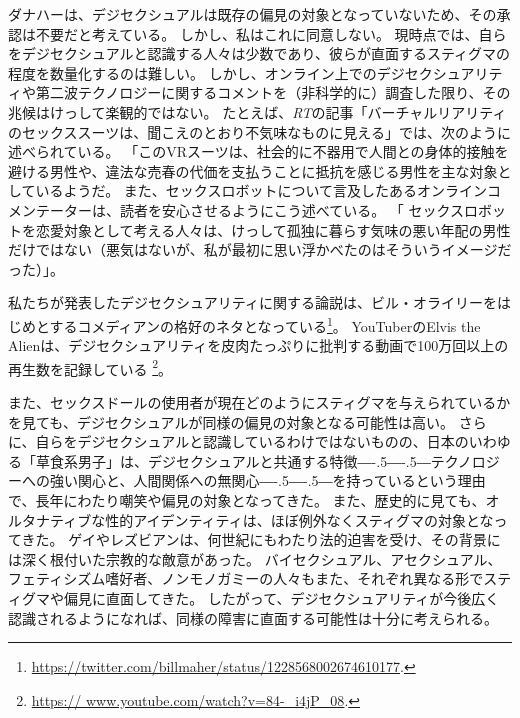 \documentclass[paper=a4,book,openany]{jlreq}
\def\DDASH{―\kern-.5\zw―\kern-.5\zw―} %
\begin{document}
ダナハーは、デジセクシュアルは既存の偏見の対象となっていないため、その承認は不要だと考えている。
しかし、私はこれに同意しない。
現時点では、自らをデジセクシュアルと認識する人々は少数であり、彼らが直面するスティグマの程度を数量化するのは難しい。
しかし、オンライン上でのデジセクシュアリティや第二波テクノロジーに関するコメントを（非科学的に）調査した限り、その兆候はけっして楽観的ではない。
たとえば、\emph{RT}の記事「バーチャルリアリティのセックススーツは、聞こえのとおり不気味なものに見える」では、次のように述べられている。
「このVRスーツは、社会的に不器用で人間との身体的接触を避ける男性や、違法な売春の代価を支払うことに抵抗を感じる男性を主な対象としているようだ\citep{rt16:_virtual_realit_sex_suit_looks}。
また、セックスロボットについて言及したあるオンラインコメンテーターは、読者を安心させるようにこう述べている。
「 セックスロボットを恋愛対象として考える人々は、けっして孤独に暮らす気味の悪い年配の男性だけではない（悪気はないが、私が最初に思い浮かべたのはそういうイメージだった）」\citep{richmond18:_rise_sex_robot}。

私たちが発表したデジセクシュアリティに関する論説は、ビル・オライリーをはじめとするコメディアンの格好のネタとなっている\footnote{\url{https://twitter.com/billmaher/status/1228568002674610177}.}。
YouTuberのElvis the Alienは、デジセクシュアリティを皮肉たっぷりに批判する動画で100万回以上の再生数を記録している
\footnote{\url{https:// www.youtube.com/watch?v=84-_i4jP_08}.}。

また、セックスドールの使用者が現在どのようにスティグマを与えられているかを見ても、デジセクシュアルが同様の偏見の対象となる可能性は高い\citep{knox17:_sex_dolls}。
さらに、自らをデジセクシュアルと認識しているわけではないものの、日本のいわゆる「草食系男子」は、デジセクシュアルと共通する特徴{\DDASH}テクノロジーへの強い関心と、人間関係への無関心{\DDASH}を持っているという理由で、長年にわたり嘲笑や偏見の対象となってきた\citep{harney09:_herbiv_dilem}。
また、歴史的に見ても、オルタナティブな性的アイデンティティは、ほぼ例外なくスティグマの対象となってきた。
ゲイやレズビアンは、何世紀にもわたり法的迫害を受け、その背景には深く根付いた宗教的な敵意があった。
バイセクシュアル、アセクシュアル、フェティシズム嗜好者、ノンモノガミーの人々もまた、それぞれ異なる形でスティグマや偏見に直面してきた\citep{klein06:_sm_sadom_inter_issue_child_custod_proceed,wright06:_discr_sm_ident_indiv,balzarini18:_dimmin_halo_aroun_monog,rothblum20:_asexual_non_asexual_respon_u}。
したがって、デジセクシュアリティが今後広く認識されるようになれば、同様の障害に直面する可能性は十分に考えられる。
\end{document}
